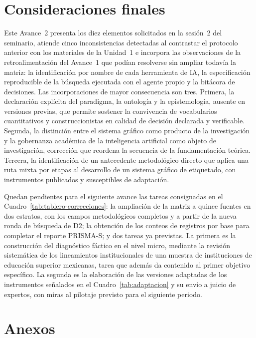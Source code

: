 \documentclass[letter,12pt]{article}
\begin{document}
\section{Consideraciones finales}

Este Avance~2 presenta los diez elementos solicitados en la sesión~2 del seminario, atiende cinco inconsistencias detectadas al contrastar el protocolo anterior con los materiales de la Unidad~1 e incorpora las observaciones de la retroalimentación del Avance~1 que podían resolverse sin ampliar todavía la matriz: la identificación por nombre de cada herramienta de IA, la especificación reproducible de la búsqueda ejecutada con el agente propio y la bitácora de decisiones. Las incorporaciones de mayor consecuencia son tres. Primera, la declaración explícita del paradigma, la ontología y la epistemología, ausente en versiones previas, que permite sostener la convivencia de vocabularios cuantitativos y construccionistas en calidad de decisión declarada y verificable. Segunda, la distinción entre el sistema gráfico como producto de la investigación y la gobernanza académica de la inteligencia artificial como objeto de investigación, corrección que reordena la secuencia de la fundamentación teórica. Tercera, la identificación de un antecedente metodológico directo que aplica una ruta mixta por etapas al desarrollo de un sistema gráfico de etiquetado, con instrumentos publicados y susceptibles de adaptación.

Quedan pendientes para el siguiente avance las tareas consignadas en el Cuadro~\ref{tab:tablero-correcciones}: la ampliación de la matriz a quince fuentes en dos estratos, con los campos metodológicos completos y a partir de la nueva ronda de búsqueda de D2; la obtención de los conteos de registros por base para completar el reporte PRISMA-S; y dos tareas ya previstas. La primera es la construcción del diagnóstico fáctico en el nivel micro, mediante la revisión sistemática de los lineamientos institucionales de una muestra de instituciones de educación superior mexicanas, tarea que además da contenido al primer objetivo específico. La segunda es la elaboración de las versiones adaptadas de los instrumentos señalados en el Cuadro~\ref{tab:adaptacion} y su envío a juicio de expertos, con miras al pilotaje previsto para el siguiente periodo.

\clearpage
\appendix
\renewcommand{\thesection}{\Alph{section}}
\section*{Anexos}
\end{document}
